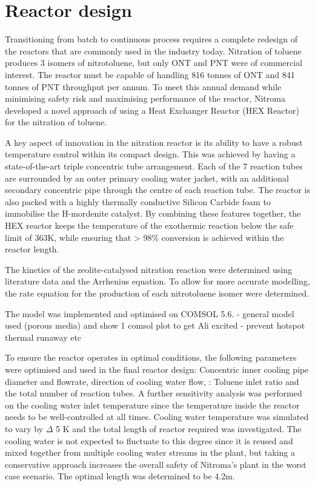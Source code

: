 \section*{Reactor design}
Transitioning from batch to continuous process requires a complete redesign of the reactors that are commonly used in the industry today. Nitration of toluene produces 3 isomers of nitrotoluene, but only ONT and PNT were of commercial interest. The reactor must be capable of handling 816 tonnes of ONT and 841 tonnes of PNT throughput per annum. To meet this annual demand while minimising safety risk and maximising performance of the reactor, Nitroma developed a novel approach of using a Heat Exchanger Reactor (HEX Reactor) for the nitration of toluene.

A key aspect of innovation in the nitration reactor is its ability to have a robust temperature control within its compact design. This was achieved by having a state-of-the-art triple concentric tube arrangement. Each of the 7 reaction tubes are surrounded by an outer primary cooling water jacket, with an additional secondary concentric pipe through the centre of each reaction tube. The reactor is also packed with a highly thermally conductive Silicon Carbide foam to immobilise the H-mordenite catalyst. By combining these features together, the HEX reactor keeps the temperature of the exothermic reaction below the safe limit of 363K, while ensuring that > 98\% conversion is achieved within the reactor length.

The kinetics of the zeolite-catalysed nitration reaction were determined using literature data and the Arrhenius equation. To allow for more accurate modelling, the rate equation for the production of each nitrotoluene isomer were determined. 

The model was implemented and optimised on COMSOL 5.6. 
- general model used (porous media) and show 1 comsol plot to get Ali excited
- prevent hotspot thermal runaway etc

To ensure the reactor operates in optimal conditions, the following parameters were optimised and used in the final reactor design: Concentric inner cooling pipe diameter and flowrate, direction of cooling water flow,  : Toluene inlet ratio and the total number of reaction tubes. A further sensitivity analysis was performed on the cooling water inlet temperature since the temperature inside the reactor needs to be well-controlled at all times. Cooling water temperature was simulated to vary by \pm $\Delta$ 5 K and the total length of reactor required was investigated. The cooling water is not expected to fluctuate to this degree since it is reused and mixed together from multiple cooling water streams in the plant, but taking a conservative approach increases the overall safety of Nitroma's plant in the worst case scenario. The optimal length was determined to be 4.2m. 


